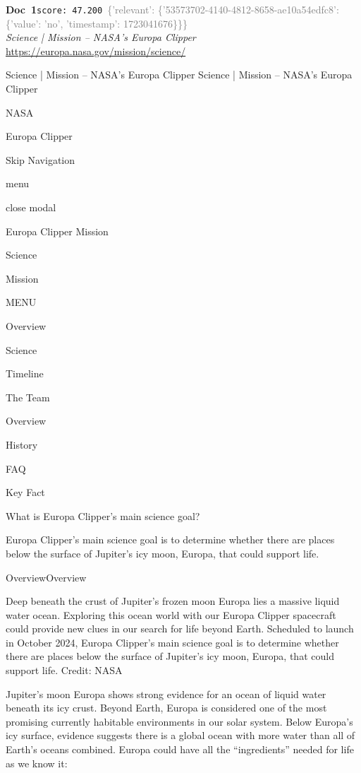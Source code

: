 \documentclass[a4paper,11pt]{article}
\begin{document}
\begin{docenv}
{\footnotesize\textcolor{doccolor}{\textbf{Doc~1}}}\hfill{\tiny\texttt{score:~47.200}}\ {\tiny\textcolor{gray}{\{'relevant': \{'53573702-4140-4812-8658-ae10a54edfc8': \{'value': 'no', 'timestamp': 1723041676\}\}\}}}\\[3pt]
{\small\textit{Science | Mission – NASA's Europa Clipper}}\\[2pt]
{\tiny\url{https://europa.nasa.gov/mission/science/}}\\[4pt]
{\footnotesize Science | Mission – NASA's Europa Clipper
Science | Mission – NASA's Europa Clipper

NASA

Europa Clipper

Skip Navigation

menu

close modal

Europa Clipper Mission

Science

Mission

MENU

Overview

Science

Timeline

The Team

Overview

History

FAQ

Key Fact

What is Europa Clipper's main science goal? 

Europa Clipper’s main science goal is to determine whether there are places below the surface of Jupiter’s icy moon, Europa, that could support life.

OverviewOverview

Deep beneath the crust of Jupiter’s frozen moon Europa lies a massive liquid water ocean. Exploring this ocean world with our Europa Clipper spacecraft could provide new clues in our search for life beyond Earth. Scheduled to launch in October 2024, Europa Clipper’s main science goal is to determine whether there are places below the surface of Jupiter’s icy moon, Europa, that could support life. Credit: NASA

Jupiter’s moon Europa shows strong evidence for an ocean of liquid water beneath its icy crust. Beyond Earth, Europa is considered one of the most promising currently habitable environments in our solar system. 
Below Europa’s icy surface, evidence suggests there is a global ocean with more water than all of Earth’s oceans combined. Europa could have all the “ingredients” needed for life as we know it: 

}
\end{docenv}
\end{document}
